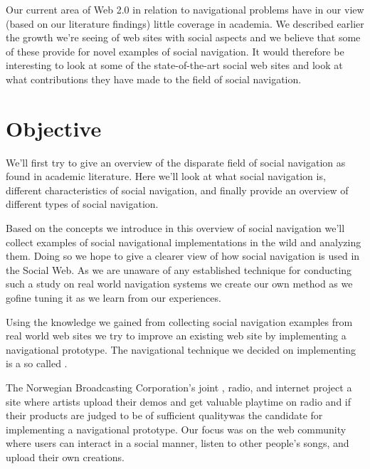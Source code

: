 Our current area of Web 2.0 in relation to navigational problems have in our
view (based on our literature findings) little coverage in academia.
We described earlier the growth we're seeing of web sites with social
aspects and we believe that some of these provide for novel examples of social
navigation. It would therefore be interesting to look at some of the
state-of-the-art social web sites and look at what contributions they have
made to the field of social navigation.

\section{Objective}

We'll first try to give an overview of the disparate field of social
navigation as found in academic literature. Here we'll look at what social
navigation is, different characteristics of social navigation, and finally
provide an overview of different types of social navigation.

Based on the concepts we introduce in this overview of social navigation we'll
collect examples of social navigational implementations in the wild
and analyzing them. Doing so we hope to give a clearer
view of how social navigation is used in the Social Web.
As we are unaware of any established technique for
conducting such a study on real world navigation systems we create our own
method as we go\dash{}fine tuning it as we learn from our experiences.

Using the knowledge we gained from collecting social navigation examples
from real world web sites we try to improve an existing web site by
implementing a navigational prototype. The navigational technique we
decided on implementing is a so called .%

The Norwegian Broadcasting Corporation's joint
, radio, and internet project \project{\urort{}}\dash{}a site where
artists upload their demos and get valuable playtime on radio and  if
their products are judged to be of sufficient quality\dash{}was
the candidate for implementing a navigational prototype.
Our focus was on the \urort{} web community%
where users can interact in a social manner, listen to other people's songs,
and upload their own creations.

